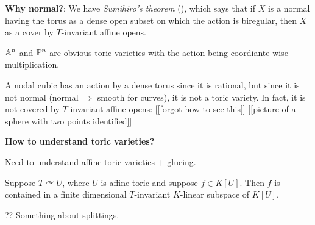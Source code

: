 \documentclass[11pt, english]{article}
\begin{document}
\textbf{Why normal?}: We have \emph{Sumihiro's theorem} (\cite{sumihiro_torus}), which says that if $X$ is a normal having the torus as a dense open subset on which the action is biregular, then $X$ as a cover by $T$-invariant affine opens.

\begin{example}
$\mathbb{A}^n$ and $\mathbb{P}^n$ are obvious toric varieties with the action being coordiante-wise multiplication.
\end{example}

\begin{example}
  A nodal cubic has an action by a dense torus since it is rational, but since it is not normal (normal $\Rightarrow$ smooth for curves), it is not a toric variety. In fact, it is not covered by $T$-invariant affine opens: [[forgot how to see this]] [[picture of a sphere with two points identified]]
\end{example}

\textbf{How to understand toric varieties?}

Need to understand affine toric varieties + glueing. 

\begin{exc}
 Suppose $T \curvearrowright U$, where $U$ is affine toric and suppose $f \in K[U]$. Then $f$ is contained in a finite dimensional $T$-invariant $K$-linear subspace of $K[U]$.
\end{exc}
\begin{sol}
  ?? Something about splittings.
\end{sol}




\end{document}

